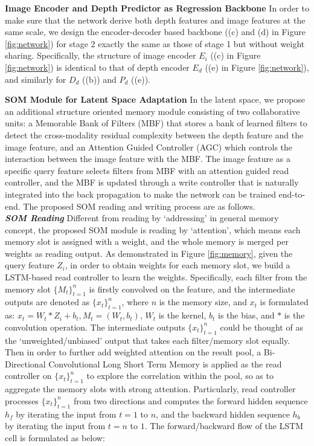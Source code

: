 \documentclass[letterpaper]{article} \usepackage{aaai20}  \usepackage{times}  \usepackage{helvet} \usepackage{courier}  \usepackage{graphicx} \frenchspacing  \setlength{\pdfpagewidth}{8.5in}  \setlength{\pdfpageheight}{11in}  \usepackage{epsfig}
\begin{document}
    \textbf{Image Encoder and Depth Predictor as Regression Backbone} \hspace{0.3cm} In order to make sure that the network derive both depth features and image features at the same scale, we design the encoder-decoder based backbone ((c) and (d) in Figure \ref{fig:network}) for stage 2 exactly the same as those of stage 1 but without weight sharing. Specifically, the structure of image encoder $E_i$ ((c) in Figure \ref{fig:network}) is identical to that of depth encoder $E_d$ ((e) in Figure \ref{fig:network}), and similarly for $D_d$ ((b)) and $P_d$ ((e)). 
    
    \textbf{SOM Module for Latent Space Adaptation} \hspace{0.3cm} In the latent space, we propose an additional structure oriented memory module consisting of two collaborative units: a Memorable Bank of Filters (MBF) that stores a bank of learned filters to detect the cross-modality residual complexity between the depth feature and the image feature, and an Attention Guided Controller (AGC) which controls the interaction between the image feature with the MBF. The image feature as a specific query feature selects filters from MBF with an attention guided read controller, and the MBF is updated through a write controller that is naturally integrated into the back propagation to make the network can be trained end-to-end. The proposed SOM reading and writing process are as follows.\\
    \indent\textbf{\textit{SOM Reading}} Different from reading by `addressing' in general memory concept, the proposed SOM module is reading by `attention', which means each memory slot is assigned with a weight, and the whole memory is merged per weights as reading output. As demonstrated in Figure \ref{fig:memory}, given the query feature $Z_i$, in order to obtain weights for each memory slot, we build a LSTM-based read controller to learn the weights. Specifically, each filter from the memory slot $\{M_t\}_{t=1}^n$ is firstly convolved on the feature, and the intermediate outputs are denoted as  $\{x_t\}_{t=1}^n$, where $n$ is the memory size, and $x_t$ is formulated as:
    $x_t = W_t * Z_i + b_t, M_t = (W_t,b_t)$, $W_t$ is the kernel, $b_t$ is the bias, and $*$ is the convolution operation. The intermediate outputs $\{x_t\}_{t=1}^n$ could be thought of as the `unweighted/unbiased' output that takes each filter/memory slot equally. Then in order to further add weighted attention on the result pool, a Bi-Directional Convolutional Long Short Term Memory is applied as the read controller on $\{x_t\}_{t=1}^n$ to explore the correlation within the pool, so as to aggregate the memory slots with strong attention. Particularly, read controller processes $\{x_t\}_{t=1}^n$ from two directions and computes the forward hidden sequence $h_f$ by iterating the input from $t=1$ to $n$, and the backward hidden sequence $h_b$ by iterating the input from $t=n$ to $1$. The forward/backward flow of the LSTM cell is formulated as below: 
\end{document}
